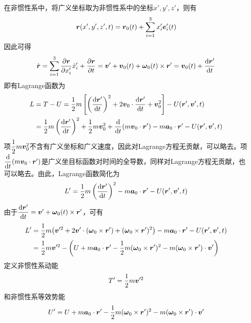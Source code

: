 在非惯性系中，将广义坐标取为非惯性系中的坐标$x',y',z'$，则有
\begin{equation*}
	\boldsymbol{r}(x',y',z',t) = \boldsymbol{r}_0(t) + \sum_{i=1}^3 x'_i \boldsymbol{e}'_i(t)
\end{equation*}
因此可得
\begin{equation*}
	\dot{\boldsymbol{r}} = \sum_{i=1}^3 \frac{\partial \boldsymbol{r}}{\partial x'_i} \dot{x}'_i + \frac{\partial \boldsymbol{r}}{\partial t} = \boldsymbol{v}' + \boldsymbol{v}_0(t) + \boldsymbol{\omega}_0(t) \times \boldsymbol{r}' = \boldsymbol{v}_0(t) + \frac{\mathrm{d} \boldsymbol{r}'}{\mathrm{d} t}
\end{equation*}
即有Lagrange函数为
\begin{align*}
	L & = T-U = \frac12 m\left[\left(\frac{\mathrm{d} \boldsymbol{r}'}{\mathrm{d} t}\right)^2 + 2\boldsymbol{v}_0 \cdot \frac{\mathrm{d} \boldsymbol{r}'}{\mathrm{d} t} + \boldsymbol{v}_0^2\right] - U(\boldsymbol{r}',\boldsymbol{v}',t) \\
	& = \frac12 m\left(\frac{\mathrm{d} \boldsymbol{r}'}{\mathrm{d} t}\right)^2 + \frac12 m \boldsymbol{v}_0^2 + \frac{\mathrm{d}}{\mathrm{d} t} (m\boldsymbol{v}_0 \cdot \boldsymbol{r}') -m \boldsymbol{a}_0 \cdot \boldsymbol{r}' - U(\boldsymbol{r}',\boldsymbol{v}',t)
\end{align*}
项$\dfrac12 m \boldsymbol{v}_0^2$不含有广义坐标和广义速度，因此对Lagrange方程无贡献，可以略去。项$\dfrac{\mathrm{d}}{\mathrm{d} t} (m\boldsymbol{v}_0 \cdot \boldsymbol{r}')$是广义坐目标函数对时间的全导数，同样对Lagrange方程无贡献，也可以略去。由此，Lagrange函数简化为
\begin{equation*}
	L' = \frac12 m\left(\frac{\mathrm{d} \boldsymbol{r}'}{\mathrm{d} t}\right)^2 -m \boldsymbol{a}_0 \cdot \boldsymbol{r}' - U(\boldsymbol{r}',\boldsymbol{v}',t)
\end{equation*}
由于$\dfrac{\mathrm{d} \boldsymbol{r}'}{\mathrm{d} t} = \boldsymbol{v}' + \boldsymbol{\omega}_0(t) \times \boldsymbol{r}'$，可有
\begin{align}
	L' & = \frac12 m \big( \boldsymbol{v}'^2 + 2\boldsymbol{v}' \cdot (\boldsymbol{\omega}_0 \times \boldsymbol{r}') + (\boldsymbol{\omega}_0 \times \boldsymbol{r}')^2 \big) - m\boldsymbol{a}_0 \cdot \boldsymbol{r}' - U(\boldsymbol{r}',\boldsymbol{v}',t) \nonumber \\
	& = \frac12 m\boldsymbol{v}'^2 - \left(U + m\boldsymbol{a}_0 \cdot \boldsymbol{r}' - \frac12 m(\boldsymbol{\omega}_0 \times \boldsymbol{r}')^2 - m(\boldsymbol{\omega}_0 \times \boldsymbol{r}') \cdot \boldsymbol{v}'\right)
	\label{非惯性系的Lagrange函数}
\end{align}
定义{\heiti 非惯性系动能}
\begin{equation}
	T' = \frac12 m \boldsymbol{v}'^2
\end{equation}
和{\heiti 非惯性系等效势能}
\begin{equation}
	U' = U + m\boldsymbol{a}_0 \cdot \boldsymbol{r}' - \frac12 m(\boldsymbol{\omega}_0 \times \boldsymbol{r}')^2 - m(\boldsymbol{\omega}_0 \times \boldsymbol{r}') \cdot \boldsymbol{v}'
\end{equation}
